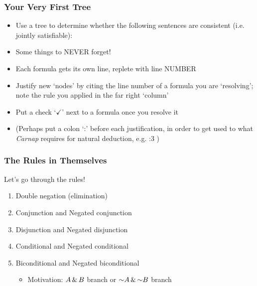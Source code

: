 \begin{frame}
\frametitle{Your Very First Tree}

\begin{itemize}[<+->]


\item Use a tree to determine whether the following sentences are consistent (i.e. jointly satisfiable):


\item Some things to NEVER forget!

\bi

\item Each formula gets its own line, replete with line NUMBER

\item Justify new `nodes' by citing the line number of a formula you are `resolving'; note the rule you applied in the far right `column' 

\item Put a check `$\checkmark$' next to a formula once you resolve it

\item (Perhaps put a colon `:' before each justification, in order to get used to what \textit{Carnap} requires for natural deduction, e.g. :3 \eand)

\ei 

\end{itemize}
\end{frame}

\begin{frame}
\frametitle{The Rules in Themselves}

Let's go through the rules!

\begin{enumerate}[<+->]

\item Double negation (elimination)

\item Conjunction and Negated conjunction

\item Disjunction and Negated disjunction

\item Conditional and Negated conditional

\item Biconditional and Negated biconditional

\begin{itemize}

\item Motivation: $A \,\&\, B$ branch or $\enot A \eand \enot B$ branch   

\end{itemize}

\end{enumerate}
\end{frame}

